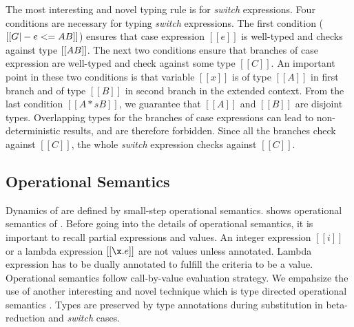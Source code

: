 The most interesting and novel typing rule is for
\emph{switch} expressions. Four conditions are necessary for typing
\emph{switch} expressions.
The first condition ($[[G |-
    e <= A \/ B]]$) ensures that case expression $[[e]]$ is well-typed
and checks against type $[[A \/ B]]$.  The next two conditions ensure that
branches of case expression are well-typed and check against some type
$[[C]]$. An important point in these two conditions is that variable
$[[x]]$ is of type $[[A]]$ in first branch and of type $[[B]]$ in
second branch in the extended context.  From the last condition
$[[A *s B]]$, we guarantee that $[[A]]$ and $[[B]]$ are disjoint
types. Overlapping types for the
branches of case expressions can lead to non-deterministic
results, and are therefore forbidden.
Since all the branches check against $[[C]]$, the whole
\emph{switch} expression checks against $[[C]]$.

\begin{comment}
\begin{figure}[t]
  \begin{small}
    \centering
    \drules[typ]{$ [[G |- e dirflag A]] $}{Bidirectional Typing}{int, var, ann, app, sub, abs, typeof}
  \end{small}
  \caption{Typing for \cal.}
  \label{fig:union:typ}
\end{figure}
\end{comment}

\subsection{Operational Semantics}
\label{sec:union:os}
Dynamics of \cal are defined by small-step operational semantics.
 shows operational semantics of \cal. Before going
into the details of operational semantics, it is important to recall
partial expressions and values. An integer expression $[[i]]$ or a
lambda expression $[[\x.e]]$ are not values unless annotated. Lambda
expression has to be dually annotated to fulfill the criteria to be a
value. Operational semantics follow call-by-value evaluation strategy.
We empahsize the use of another interesting and novel technique which
is type directed operational semantics . Types
are preserved by type annotations during substitution in
beta-reduction and \emph{switch} cases.

